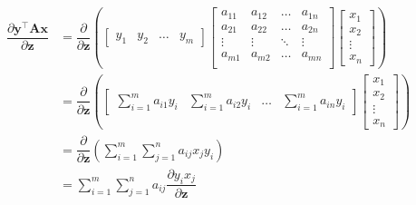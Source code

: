 \documentclass{article}
\newcommand{\trans}{\top}
\begin{document}
\begin{align}
    \dfrac{\partial \mathbf{y}^\trans \mathbf{A} \mathbf{x}}{\partial \mathbf{z}} &= \dfrac{\partial}{\partial \mathbf{z}} \left(
    \begin{bmatrix}
        y_{1} & y_{2} & \dots & y_{m}
    \end{bmatrix}
    \begin{bmatrix}
        a_{11} & a_{12} & \dots & a_{1n} \\
        a_{21} & a_{22} & \dots & a_{2n} \\
        \vdots & \vdots & \ddots & \vdots \\
        a_{m1} & a_{m2} & \dots & a_{mn} \\
    \end{bmatrix} \begin{bmatrix}
        x_{1} \\ x_{2} \\ \vdots \\ x_{n}
    \end{bmatrix} \right) \\
    &= \dfrac{\partial}{\partial \mathbf{z}} \left(
			\begin{bmatrix}
				\displaystyle \sum_{i = 1}^{m} a_{i1}y_{i} & 
				\displaystyle \sum_{i = 1}^{m} a_{i2}y_{i} & 
				\dots & 
				\displaystyle \sum_{i = 1}^{m} a_{in}y_{i}
			\end{bmatrix} \begin{bmatrix}
				x_{1} \\ x_{2} \\ \vdots \\ x_{n}
			\end{bmatrix} \right) \\
    &= \dfrac{\partial}{\partial \mathbf{z}} \left(
        \sum_{i = 1}^{m}\sum_{j = 1}^{n} a_{ij} x_{j} y_{i}
    \right) \\
    &= \sum_{i = 1}^{m}\sum_{j = 1}^{n} a_{ij} \dfrac{\partial y_{i}x_{j}}{\partial \mathbf{z}} %
\end{align}
\end{document}
